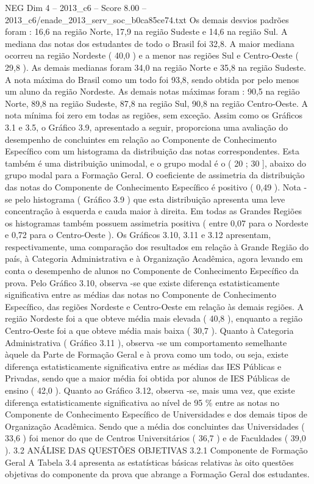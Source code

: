 \begin{textsample}{NEG Dim 4 – 2013\_c6 – Score 8.00 – 2013\_c6/enade\_2013\_serv\_soc\_b0ca85ce74.txt}
Os demais desvios padrões foram : 16,6 na região Norte, 17,9 na região Sudeste e 14,6 na região Sul.
A mediana das notas dos estudantes de todo o Brasil foi 32,8.
A maior mediana ocorreu na região Nordeste ( 40,0 ) e a menor nas regiões Sul e Centro-Oeste ( 29,8 ).
As demais medianas foram 34,0 na região Norte e 35,8 na região Sudeste.
A nota máxima do Brasil como um todo foi 93,8, sendo obtida por pelo menos um aluno da região Nordeste.
As demais notas máximas foram : 90,5 na região Norte, 89,8 na região Sudeste, 87,8 na região Sul, 90,8 na região Centro-Oeste.
A nota mínima foi zero em todas as regiões, sem exceção.
Assim como os Gráficos 3.1 e 3.5, o Gráfico 3.9, apresentado a seguir, proporciona uma avaliação do desempenho de concluintes em relação ao Componente de Conhecimento Específico com um histograma da distribuição das notas correspondentes.
Esta também é uma distribuição unimodal, e o grupo modal é o ( 20 ; 30 ], abaixo do grupo modal para a Formação Geral.
O coeficiente de assimetria da distribuição das notas do Componente de Conhecimento Específico é positivo ( 0,49 ).
Nota -se pelo histograma ( Gráfico 3.9 ) que esta distribuição apresenta uma leve concentração à esquerda e cauda maior à direita.
Em todas as Grandes Regiões os histogramas também possuem assimetria positiva ( entre 0,07 para o Nordeste e 0,72 para o Centro-Oeste ).
Os Gráficos 3.10, 3.11 e 3.12 apresentam, respectivamente, uma comparação dos resultados em relação à Grande Região do país, à Categoria Administrativa e à Organização Acadêmica, agora levando em conta o desempenho de alunos no Componente de Conhecimento Específico da prova.
Pelo Gráfico 3.10, observa -se que existe diferença estatisticamente significativa entre as médias das notas no Componente de Conhecimento Específico, das regiões Nordeste e Centro-Oeste em relação às demais regiões.
A região Nordeste foi a que obteve média mais elevada ( 40,8 ), enquanto a região Centro-Oeste foi a que obteve média mais baixa ( 30,7 ).
Quanto à Categoria Administrativa ( Gráfico 3.11 ), observa -se um comportamento semelhante àquele da Parte de Formação Geral e à prova como um todo, ou seja, existe diferença estatisticamente significativa entre as médias das IES Públicas e Privadas, sendo que a maior média foi obtida por alunos de IES Públicas de ensino ( 42,0 ).
Quanto ao Gráfico 3.12, observa -se, mais uma vez, que existe diferença estatisticamente significativa ao nível de 95 \% entre as notas no Componente de Conhecimento Específico de Universidades e dos demais tipos de Organização Acadêmica.
Sendo que a média dos concluintes das Universidades ( 33,6 ) foi menor do que de Centros Universitários ( 36,7 ) e de Faculdades ( 39,0 ). 3.2 ANÁLISE DAS QUESTÕES OBJETIVAS 3.2.1 Componente de Formação Geral A Tabela 3.4 apresenta as estatísticas básicas relativas às oito questões objetivas do componente da prova que abrange a Formação Geral dos estudantes.

\end{textsample}
